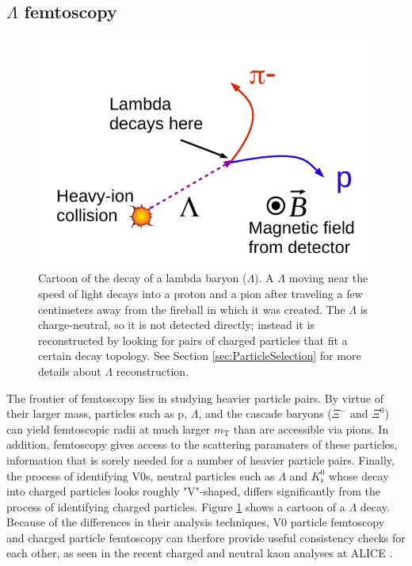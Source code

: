 \subsection{$\Lambda$ femtoscopy}
\label{sec:LambdaFemto}

\begin{figure}[hbt]
\includegraphics[width=36pc]{Figures/HomemadeFigures/LambdaDecayCartoon.pdf}
\caption[Cartoon of lambda decay]
{
Cartoon of the decay of a lambda baryon ($\Lambda$).
A $\Lambda$ moving near the speed of light decays into a proton and a pion after traveling a few centimeters away from the fireball in which it was created. 
The $\Lambda$ is charge-neutral, so it is not detected directly; instead it is reconstructed by looking for pairs of charged particles that fit a certain decay topology.
See Section \ref{sec:ParticleSelection} for more details about $\Lambda$ reconstruction.
}
\label{fig:LambdaDecayCartoon}
\end{figure}

The frontier of femtoscopy lies in studying heavier particle pairs.
By virtue of their larger mass, particles such as p, $\Lambda$, and the cascade baryons ($\Xi^-$ and $\Xi^0$) can yield femtoscopic radii at much larger $m_\mathrm{T}$ than are accessible via pions.
In addition, femtoscopy gives access to the scattering paramaters of these particles, information that is sorely needed for a number of heavier particle pairs.
Finally, the process of identifying V0s, neutral particles such as $\Lambda$ and $K^0_\mathrm{s}$ whose decay into charged particles looks roughly "V"-shaped, differs significantly from the process of identifying charged particles.
Figure \ref{fig:LambdaDecayCartoon} shows a cartoon of a $\Lambda$ decay.
Because of the differences in their analysis techniques, V0 particle femtoscopy and charged particle femtoscopy can therfore provide useful consistency checks for each other, as seen in the recent charged and neutral kaon analyses at ALICE \cite{Adam:2015vja}.

